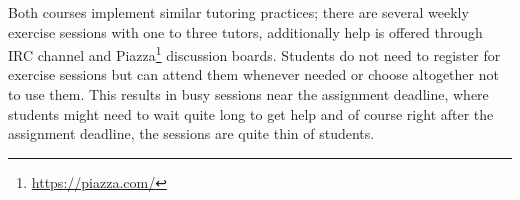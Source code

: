 Both courses implement similar tutoring practices; there are several weekly exercise sessions with one to three tutors, additionally help is offered through IRC channel and Piazza\footnote{ \url{https://piazza.com/}} discussion boards. Students do not need to register for exercise sessions but can attend them whenever needed or choose altogether not to use them. This results in busy sessions near the assignment deadline, where students might need to wait quite long to get help and of course right after the assignment deadline, the sessions are quite thin of students.
